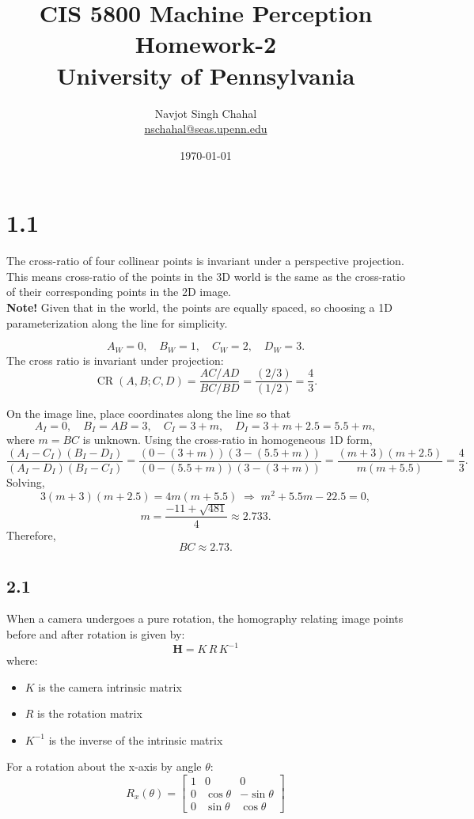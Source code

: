 \documentclass[12pt]{article}
\title{CIS 5800 Machine Perception Homework-2 \\ University of Pennsylvania}
\author{Navjot Singh Chahal \\ \href{mailto:nschahal@seas.upenn.edu}{nschahal@seas.upenn.edu}}
\date{\today}
\begin{document}
\maketitle

\section*{1.1}
The cross-ratio of four collinear points is invariant under a perspective projection.
This means cross-ratio of the points in the 3D world is the same as the cross-ratio of their corresponding points in the 2D image.
\\
\textbf{Note!} Given that in the world, the points are equally spaced, so choosing a 1D parameterization along the line for simplicity.

\[
A_W=0,\quad B_W=1,\quad C_W=2,\quad D_W=3 .
\]
The cross ratio is invariant under projection:
\[
\operatorname{CR}(A,B;C,D)=\frac{AC/AD}{BC/BD}
=\frac{(2/3)}{(1/2)}=\frac{4}{3}.
\]

On the image line, place coordinates along the line so that
\[
A_I=0,\quad B_I=AB=3,\quad C_I=3+m,\quad D_I=3+m+2.5=5.5+m,
\]
where \(m=BC\) is unknown. Using the cross-ratio in homogeneous 1D form,
\[
\frac{(A_I-C_I)(B_I-D_I)}{(A_I-D_I)(B_I-C_I)}
=\frac{(0-(3+m))(3-(5.5+m))}{(0-(5.5+m))(3-(3+m))}
=\frac{(m+3)(m+2.5)}{m(m+5.5)}=\frac{4}{3}.
\]
Solving,
\[
3(m+3)(m+2.5)=4m(m+5.5)\;\Rightarrow\;
m^2+5.5m-22.5=0,
\]
\[
m=\frac{-11+\sqrt{481}}{4}\approx 2.733.
\]
Therefore,
\[
\boxed{BC \approx 2.73}.
\]

\subsection*{2.1}

When a camera undergoes a pure rotation, the homography relating image points before and after rotation is given by:
\[
\mathbf{H} = K \, R \, K^{-1}
\]
where:
\begin{itemize}
    \item $K$ is the camera intrinsic matrix
    \item $R$ is the rotation matrix
    \item $K^{-1}$ is the inverse of the intrinsic matrix
\end{itemize}

For a rotation about the x-axis by angle $\theta$:
\[
R_x(\theta) = \begin{bmatrix}
1 & 0 & 0 \\
0 & \cos\theta & -\sin\theta \\
0 & \sin\theta & \cos\theta
\end{bmatrix}
\]
\end{document}
